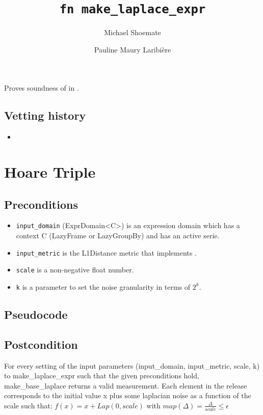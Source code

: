 \documentclass{article} %
\title{\texttt{fn make\_laplace\_expr}}
\author{Michael Shoemate \and Pauline Maury Laribière}\date{}
\begin{document}
\maketitle\contrib
Proves soundness of  in .

\subsection*{Vetting history}
\begin{itemize}
    \item {}
\end{itemize}


\section{Hoare Triple}
\subsection*{Preconditions}
\begin{itemize}
    \item \texttt{input\_domain} (ExprDomain<C>) is an expression domain which has a context C (LazyFrame or LazyGroupBy) and has an active serie.
    \item \texttt{input\_metric} is the L1Distance metric that implements .
    \item \texttt{scale} is a non-negative float number.
    \item \texttt{k} is a parameter to set the noise granularity in terms of $2^k$.
\end{itemize}

\subsection*{Pseudocode}
\label{sec:python-pseudocode}


\subsection*{Postcondition}
For every setting of the input parameters (input\_domain, input\_metric, scale, k) to make\_laplace\_expr such that the given preconditions hold, make\_base\_laplace returns a valid measurement.
Each element in the release corresponds to the initial value x plus some laplacian noise as a function of the scale such that: 
$f(x) = x + Lap(0, scale)$
with $map(\Delta) = \frac{\Delta}{scale} \leq \epsilon$
\end{document}
